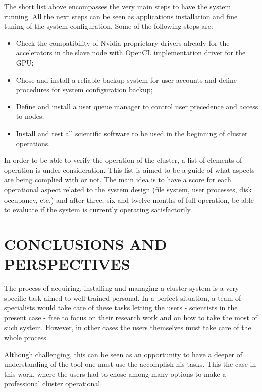 \documentclass[twoside,a4paper,12pt,english]{inac17}
\begin{document}
The short list above encompasses the very main steps to have the system running. All the next
steps can be seen as applications installation and fine tuning of the system configuration.
Some of the following steps are:

\begin{itemize}
\item Check the compatibility of Nvidia proprietary drivers already for the accelerators in the slave node with OpenCL implementation driver for the GPU;
\item Chose and install a reliable backup system for user accounts and define procedures for system configuration backup;
\item Define and install a user queue manager to control user precedence and access to nodes;
\item Install and test all scientific software to be used in the beginning of cluster operations.
\end{itemize}

In order to be able to verify the operation of the cluster, a list of elements of operation is under consideration.
This list is aimed to be a guide of what aspects are being complied with or not. The main idea is to have a score for
each operational aspect related to the system design (file system, user processes, disk occupancy, etc.) and after three, six and twelve months of full operation, be able to evaluate if the system is currently
operating satisfactorily.


\section{CONCLUSIONS AND PERSPECTIVES}


The process of acquiring, installing and managing a cluster system is a very specific task aimed to well trained
personal. In a perfect situation, a team of specialists would take care of these tasks letting the users - scientists in the present case -
free to focus on their research work and on how to take the most of such system. However, in other cases the users themselves must
take care of the whole process.

Although challenging, this can be seen as an opportunity to have a deeper of understanding of the tool one must use the accomplish his tasks.
This the case in this work, where the users had to chose among many options to make a professional cluster operational.
\end{document}
